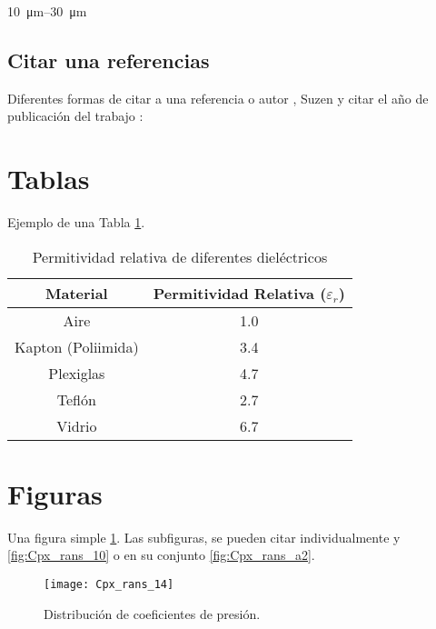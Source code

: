\SIrange{10}{30}{\um}

\subsection{Citar una referencias}

Diferentes formas de citar a una referencia o autor \citet{abdollahzadeh2016implementation}, Suzen \cite{suzen_numerical_2005} y citar el año de publicación del trabajo \citeyear{dorr_numerical_2015}:

\section{Tablas}



Ejemplo de una Tabla \ref{tab:dielectricK}.

\begin{table}[!ht]
\centering
\caption{Permitividad relativa de diferentes dieléctricos}
\label{tab:dielectricK}
\begin{tabular}{@{}cc@{}}
\toprule
Material           & Permitividad Relativa ($\varepsilon_r$)\\ \midrule
Aire               & 1.0                   \\
Kapton (Poliimida) & 3.4                   \\
Plexiglas          & 4.7                   \\
Teflón             & 2.7                   \\
Vidrio             & 6.7                   \\ \bottomrule
\end{tabular}
\end{table}

\section{Figuras}

Una figura simple \ref{fig:Cpx_rans_14}. Las subfiguras, se pueden citar individualmente  y \ref{fig:Cpx_rans_10} o en su conjunto \ref{fig:Cpx_rans_a2}.

\begin{figure}[ht!]
  \centering
    \texttt{[image: Cpx\_rans\_14]}    
    \caption{Distribución de coeficientes de presión.}         
  \label{fig:Cpx_rans_14}                          
\end{figure}


